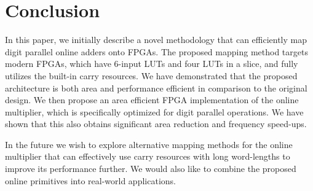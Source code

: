 \documentclass[conference]{IEEEtran}
\begin{document}
\section{Conclusion}
In this paper, we initially describe a novel methodology that can efficiently map digit parallel online adders onto FPGAs. The proposed mapping method targets modern FPGAs, which have 6-input LUTs and four LUTs in a slice, and fully utilizes the built-in carry resources. We have demonstrated  that the proposed architecture is both area and performance efficient in comparison to the original design. We then propose an area efficient FPGA implementation of the online multiplier, which is specifically optimized for digit parallel operations. We have shown that this also obtains significant area reduction and frequency speed-ups.

In the future we wish to explore alternative mapping methods for the online multiplier that can effectively use carry resources with long word-lengths to improve  its performance further. We would also like to combine the proposed online primitives into real-world applications.











%


\end{document}
